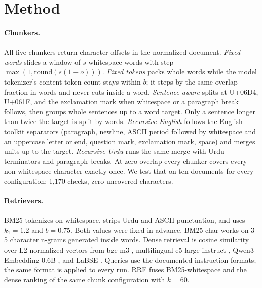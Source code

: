\documentclass[11pt]{article}
\begin{document}
\section{Method}

\paragraph{Chunkers.}
All five chunkers return character offsets in the normalized document.
\emph{Fixed words} slides a window of $s$ whitespace words with step
$\max(1,\mathrm{round}(s(1-o)))$.
\emph{Fixed tokens} packs whole words while the model tokenizer's content-token count stays within
$b$; it steps by the same overlap fraction in words and never cuts inside a word.
\emph{Sentence-aware} splits at U+06D4, U+061F, and the exclamation mark when whitespace or a
paragraph break follows, then groups whole sentences up to a word target. Only a sentence longer
than twice the target is split by words.
\emph{Recursive-English} follows the English-toolkit separators (paragraph, newline, ASCII period
followed by whitespace and an uppercase letter or end, question mark, exclamation mark, space) and
merges units up to the target.
\emph{Recursive-Urdu} runs the same merge with Urdu terminators and paragraph breaks.
At zero overlap every chunker covers every non-whitespace character exactly once. We test that on
ten documents for every configuration: 1{,}170 checks, zero uncovered characters.

\paragraph{Retrievers.}
BM25 tokenizes on whitespace, strips Urdu and ASCII punctuation, and uses $k_1=1.2$ and $b=0.75$.
Both values were fixed in advance. BM25-char works on 3--5 character n-grams generated inside
words. Dense retrieval is cosine similarity over L2-normalized vectors from bge-m3
\citep{chen2024m3embedding}, multilingual-e5-large-instruct \citep{wang2024multilingual},
Qwen3-Embedding-0.6B \citep{zhang2025qwen3}, and LaBSE \citep{feng2020languageagnostic}. Queries use
the documented instruction formats; the same format is applied to every run. RRF fuses
BM25-whitespace and the dense ranking of the same chunk configuration with $k=60$.
\end{document}
